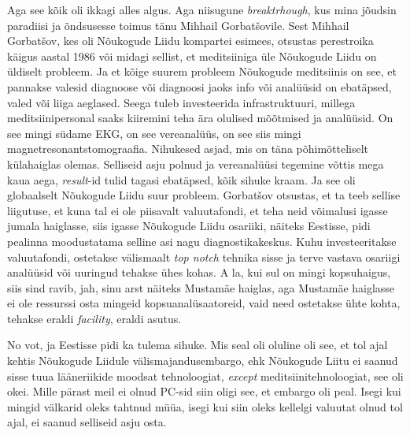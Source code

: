 Aga see kõik oli ikkagi alles algus. Aga niisugune \emph{breaktrhough}, kus 
mina jõudsin paradiisi ja õndsusesse  toimus  tänu Mihhail Gorbatšovile. Sest 
Mihhail Gorbatšov, kes oli Nõukogude Liidu  kompartei esimees, otsustas 
perestroika käigus aastal 1986 või midagi sellist, et meditsiiniga üle Nõukogude 
Liidu on üldiselt probleem. Ja et kõige suurem probleem Nõukogude meditsiinis 
on see, et pannakse valesid diagnoose või diagnoosi jaoks info või analüüsid on 
ebatäpsed, valed või liiga aeglased. Seega tuleb investeerida infrastruktuuri, 
millega meditsiinipersonal saaks kiiremini teha ära olulised mõõtmised ja 
analüüsid. On see mingi südame EKG, on see vereanalüüs, on see siis mingi 
magnetresonantstomograafia. Nihukesed asjad, mis on täna põhimõtteliselt  
külahaiglas olemas. Selliseid asju polnud ja vereanalüüsi tegemine võttis mega 
kaua aega, \emph{result}-id tulid tagasi ebatäpsed, kõik sihuke kraam.  Ja see 
oli globaalselt Nõukogude Liidu suur probleem. Gorbatšov otsustas, et ta teeb 
sellise liigutuse, et kuna tal ei ole piisavalt valuutafondi, et teha neid 
võimalusi igasse jumala haiglasse, siis igasse Nõukogude Liidu osariiki, 
näiteks Eestisse, pidi pealinna moodustatama selline asi nagu 
diagnostikakeskus. Kuhu  investeeritakse valuutafondi, ostetakse välismaalt 
\emph{top notch} tehnika sisse ja terve vastava osariigi analüüsid või uuringud 
tehakse ühes kohas. A la, kui sul on mingi kopsuhaigus, siis sind ravib, jah, 
sinu arst näiteks Mustamäe haiglas, aga Mustamäe haiglasse ei ole ressurssi 
osta mingeid kopsuanalüsaatoreid, vaid need ostetakse ühte kohta,  tehakse 
eraldi \emph{facility}, eraldi asutus.

No vot, ja Eestisse pidi ka tulema sihuke. Mis seal oli oluline oli see, et 
 tol ajal kehtis Nõukogude Liidule välismajandusembargo, ehk Nõukogude 
Liitu ei saanud sisse tuua lääneriikide moodsat tehnoloogiat, \emph{except} 
meditsiinitehnoloogiat, see oli okei. Mille pärast meil ei olnud PC-sid siin 
oligi see, et  embargo oli peal. Isegi kui mingid välkarid oleks tahtnud müüa, 
isegi kui siin oleks kellelgi valuutat  olnud tol ajal, ei saanud  
selliseid asju osta. 


